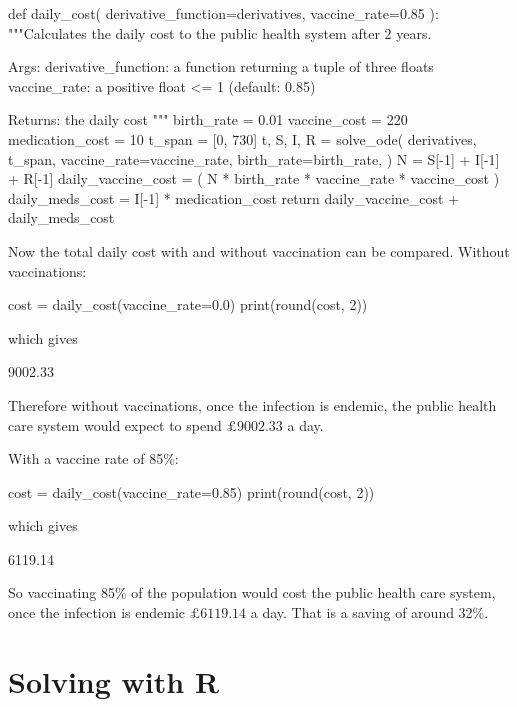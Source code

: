 \begin{pyin}
def daily_cost(
    derivative_function=derivatives, vaccine_rate=0.85
):
    """Calculates the daily cost to the public health system
    after 2 years.

    Args:
        derivative_function: a function returning a tuple
                             of three floats
        vaccine_rate: a positive float <= 1 (default: 0.85)

    Returns:
        the daily cost
    """
    birth_rate = 0.01
    vaccine_cost = 220
    medication_cost = 10
    t_span = [0, 730]
    t, S, I, R = solve_ode(
        derivatives,
        t_span,
        vaccine_rate=vaccine_rate,
        birth_rate=birth_rate,
    )
    N = S[-1] + I[-1] + R[-1]
    daily_vaccine_cost = (
        N * birth_rate * vaccine_rate * vaccine_cost
    )
    daily_meds_cost = I[-1] * medication_cost
    return daily_vaccine_cost + daily_meds_cost
\end{pyin}

Now the total daily cost with and without vaccination can be compared.
Without vaccinations:

\begin{pyin}
cost = daily_cost(vaccine_rate=0.0)
print(round(cost, 2))
\end{pyin}

which gives

\begin{pyout}
9002.33
\end{pyout}

Therefore without vaccinations, once the infection is endemic, the public health
care system would expect to spend $\pounds 9002.33$ a day.

With a vaccine rate of 85\%:

\begin{pyin}
cost = daily_cost(vaccine_rate=0.85)
print(round(cost, 2))
\end{pyin}

which gives

\begin{pyout}
6119.14
\end{pyout}

So vaccinating 85\% of the population would cost the public health care system,
once the infection is endemic $\pounds 6119.14$ a day. That is a saving of
around 32\%.


\section{Solving with R}\label{sec:solving-with-R}

